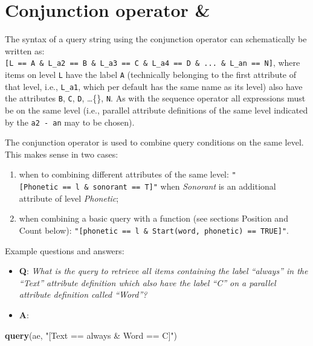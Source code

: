 \documentclass[]{book}
\newenvironment{Shaded}{\begin{snugshade}}{\end{snugshade}}
\newcommand{\KeywordTok}[1]{\textcolor[rgb]{0.13,0.29,0.53}{\textbf{#1}}}
\newcommand{\NormalTok}[1]{#1}
\newcommand{\StringTok}[1]{\textcolor[rgb]{0.31,0.60,0.02}{#1}}
\providecommand{\tightlist}{%
  \setlength{\itemsep}{0pt}\setlength{\parskip}{0pt}}
\begin{document}
\hypertarget{conjunction-operator}{%
\section{Conjunction operator \&}\label{conjunction-operator}}

The syntax of a query string using the conjunction operator can schematically be written as: \texttt{{[}L\ ==\ A\ \&\ L\_a2\ ==\ B\ \&\ L\_a3\ ==\ C\ \&\ L\_a4\ ==\ D\ \&\ ...\ \&\ L\_an\ ==\ N{]}}, where items on level \texttt{L} have the label \texttt{A} (technically belonging to the first attribute of that level, i.e., \texttt{L\_a1}, which per default has the same name as its level) also have the attributes \texttt{B}, \texttt{C}, \texttt{D}, \ldots\{\}, \texttt{N}. As with the sequence operator all expressions must be on the same level (i.e., parallel attribute definitions of the same level indicated by the \texttt{a2\ -\ an} may to be chosen).

The conjunction operator is used to combine query conditions on the same level. This makes sense in two cases:

\begin{enumerate}
\def\labelenumi{\arabic{enumi}.}
\tightlist
\item
  when to combining different attributes of the same level: \texttt{"{[}Phonetic\ ==\ l\ \&\ sonorant\ ==\ T{]}"} when \emph{Sonorant} is an additional attribute of level \emph{Phonetic};
\item
  when combining a basic query with a function (see sections Position and Count below): \texttt{"{[}phonetic\ ==\ l\ \&\ Start(word,\ phonetic)\ ==\ TRUE{]}"}.
\end{enumerate}

Example questions and answers:

\begin{itemize}
\tightlist
\item
  \textbf{Q}: \emph{What is the query to retrieve all items containing the label ``always'' in the ``Text'' attribute definition which also have the label ``C'' on a parallel attribute definition called ``Word''?}
\item
  \textbf{A}:
\end{itemize}

\begin{Shaded}
\begin{Highlighting}[]
\KeywordTok{query}\NormalTok{(ae, }\StringTok{"[Text == always & Word == C]"}\NormalTok{)}
\end{Highlighting}
\end{Shaded}
\end{document}
